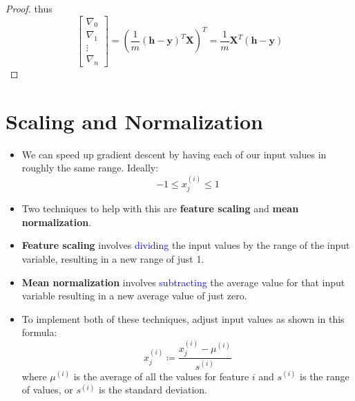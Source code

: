 \begin{itemize}
\begin{proof}
        thus
        \begin{equation}
            \left[\begin{matrix} \nabla_0 \\ \nabla_1 \\ \vdots \\ \nabla_n \end{matrix}\right] = \left( \frac{1}{m}(\mathbf{h}-\mathbf{y})^T \mathbf{X} \right)^T
                                                                                                = \frac{1}{m} \mathbf{X}^T (\mathbf{h}-\mathbf{y})
        \end{equation}
    \end{proof}

\end{itemize}


\section{Scaling and Normalization}
\begin{itemize} 
    \item We can speed up gradient descent by having each of our input values in roughly the same range. Ideally:
    \begin{equation}
        -1 \leq x^{(i)}_j \leq 1
    \end{equation}
    \item Two techniques to help with this are \textbf{feature scaling} and \textbf{mean normalization}.
    \item \textbf{Feature scaling} involves \textcolor{blue}{dividing} the input values by the range of the input variable, resulting in a new range of just 1.
    \item \textbf{Mean normalization} involves \textcolor{blue}{subtracting} the average value for that input variable resulting in a new average value of just zero. 
    \item To implement both of these techniques, adjust input values as shown in this formula:
    \begin{equation}
        x^{(i)}_j \coloneqq \frac{x^{(i)}_j-\mu^{(i)}}{s^{(i)}}
    \end{equation}
    where $\mu^{(i)}$ is the average of all the values for feature $i$ and $s^{(i)}$ is the range of values, or $s^{(i)}$ is the standard deviation.
\end{itemize}


